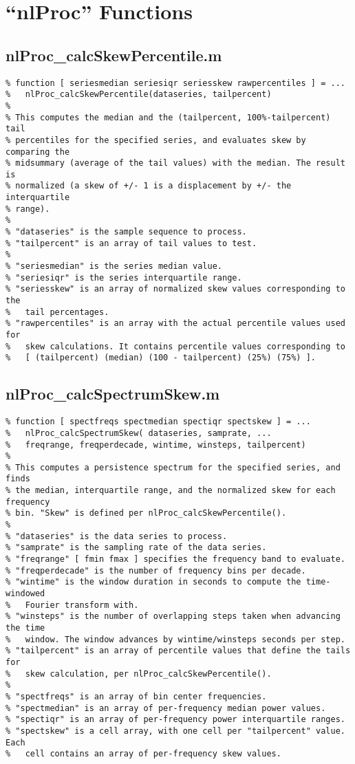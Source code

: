 \chapter{``nlProc'' Functions}
\label{sect-proc}

\section{nlProc\_calcSkewPercentile.m}

\begin{verbatim}
% function [ seriesmedian seriesiqr seriesskew rawpercentiles ] = ...
%   nlProc_calcSkewPercentile(dataseries, tailpercent)
%
% This computes the median and the (tailpercent, 100%-tailpercent) tail
% percentiles for the specified series, and evaluates skew by comparing the
% midsummary (average of the tail values) with the median. The result is
% normalized (a skew of +/- 1 is a displacement by +/- the interquartile
% range).
%
% "dataseries" is the sample sequence to process.
% "tailpercent" is an array of tail values to test.
%
% "seriesmedian" is the series median value.
% "seriesiqr" is the series interquartile range.
% "seriesskew" is an array of normalized skew values corresponding to the
%   tail percentages.
% "rawpercentiles" is an array with the actual percentile values used for
%   skew calculations. It contains percentile values corresponding to
%   [ (tailpercent) (median) (100 - tailpercent) (25%) (75%) ].
\end{verbatim}

\section{nlProc\_calcSpectrumSkew.m}

\begin{verbatim}
% function [ spectfreqs spectmedian spectiqr spectskew ] = ...
%   nlProc_calcSpectrumSkew( dataseries, samprate, ...
%   freqrange, freqperdecade, wintime, winsteps, tailpercent)
%
% This computes a persistence spectrum for the specified series, and finds
% the median, interquartile range, and the normalized skew for each frequency
% bin. "Skew" is defined per nlProc_calcSkewPercentile().
%
% "dataseries" is the data series to process.
% "samprate" is the sampling rate of the data series.
% "freqrange" [ fmin fmax ] specifies the frequency band to evaluate.
% "freqperdecade" is the number of frequency bins per decade.
% "wintime" is the window duration in seconds to compute the time-windowed
%   Fourier transform with.
% "winsteps" is the number of overlapping steps taken when advancing the time
%   window. The window advances by wintime/winsteps seconds per step.
% "tailpercent" is an array of percentile values that define the tails for
%   skew calculation, per nlProc_calcSkewPercentile().
%
% "spectfreqs" is an array of bin center frequencies.
% "spectmedian" is an array of per-frequency median power values.
% "spectiqr" is an array of per-frequency power interquartile ranges.
% "spectskew" is a cell array, with one cell per "tailpercent" value. Each
%   cell contains an array of per-frequency skew values.
\end{verbatim}

